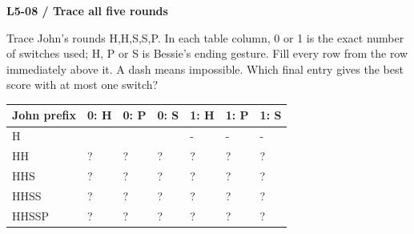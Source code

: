 \documentclass[11pt,a4paper]{article}
\begin{document}
\par\noindent\begin{minipage}{\linewidth}
\textbf{L5-08 / Trace all five rounds}\par\smallskip Trace John's rounds H,H,S,S,P. In each table column, 0 or 1 is the exact number of switches used; H, P or S is Bessie's ending gesture. Fill every row from the row immediately above it. A dash means impossible. Which final entry gives the best score with at most one switch?\par
\par\medskip \begingroup\small\setlength{\tabcolsep}{4pt}\renewcommand{\arraystretch}{1.35}\begin{tabularx}{\linewidth}{>{\raggedright\arraybackslash}l>{\raggedright\arraybackslash}X>{\raggedright\arraybackslash}X>{\raggedright\arraybackslash}X>{\raggedright\arraybackslash}X>{\raggedright\arraybackslash}X>{\raggedright\arraybackslash}X}\toprule\textbf{John prefix} & \textbf{0: H} & \textbf{0: P} & \textbf{0: S} & \textbf{1: H} & \textbf{1: P} & \textbf{1: S}\\\midrule
H & 0 & 1 & 0 & - & - & -\\
HH & ? & ? & ? & ? & ? & ?\\
HHS & ? & ? & ? & ? & ? & ?\\
HHSS & ? & ? & ? & ? & ? & ?\\
HHSSP & ? & ? & ? & ? & ? & ?\\
\bottomrule\end{tabularx}\endgroup\par\medskip 
\end{minipage}\par\vspace{4mm}
\end{document}
